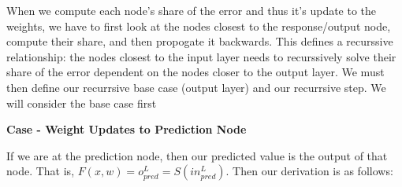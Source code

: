 \documentclass[11pt]{article}
\begin{document}
\vspace{5 mm}
\noindent
When we compute each node's share of the error and thus it's update to the 
weights, we have to first look at the nodes closest to the response/output 
node, compute their share, and then propogate it backwards. This defines a 
recurssive relationship: the nodes closest to the input layer needs to 
recurssively solve their share of the error dependent on the nodes closer to 
the output layer. We must then define our recurrsive base case (output layer) 
and our recurrsive step. We will consider the base case first

\vspace{5 mm}
\noindent
\textbf{Case - Weight Updates to Prediction Node}

\vspace{5 mm}
\noindent
If we are at the prediction node, then our predicted value is the output of 
that node. That is, $F(x, w) = o_{pred}^{L} = S(in_{pred}^{L})$. Then our 
derivation is as follows:
\end{document}
